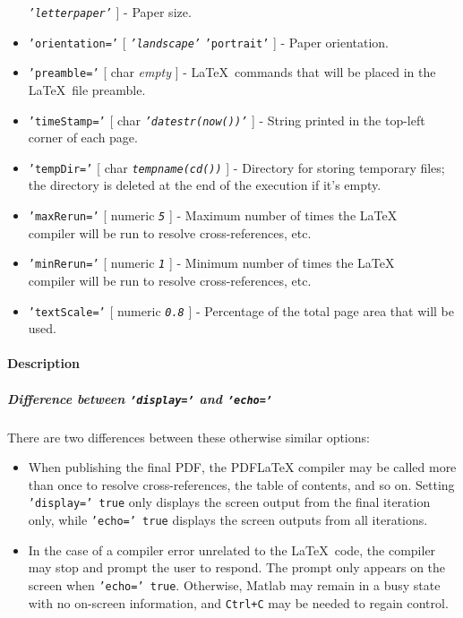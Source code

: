 \begin{itemize}
  \emph{\texttt{'letterpaper'}} {]} - Paper size.
\item
  \texttt{'orientation='} {[} \emph{\texttt{'landscape'}} \textbar{}
  \texttt{'portrait'} {]} - Paper orientation.
\item
  \texttt{'preamble='} {[} char \textbar{} \emph{empty} {]} -
  \LaTeX~commands that will be placed in the \LaTeX~file preamble.
\item
  \texttt{'timeStamp='} {[} char \textbar{}
  \emph{\texttt{'datestr(now())'}} {]} - String printed in the top-left
  corner of each page.
\item
  \texttt{'tempDir='} {[} char \textbar{} \emph{\texttt{tempname(cd())}}
  {]} - Directory for storing temporary files; the directory is deleted
  at the end of the execution if it's empty.
\item
  \texttt{'maxRerun='} {[} numeric \textbar{} \emph{\texttt{5}} {]} -
  Maximum number of times the \LaTeX\\compiler will be run to resolve
  cross-references, etc.
\item
  \texttt{'minRerun='} {[} numeric \textbar{} \emph{\texttt{1}} {]} -
  Minimum number of times the \LaTeX\\compiler will be run to resolve
  cross-references, etc.
\item
  \texttt{'textScale='} {[} numeric \textbar{} \emph{\texttt{0.8}} {]} -
  Percentage of the total page area that will be used.
\end{itemize}

\paragraph{Description}

\subparagraph{Difference between \texttt{'display='} and
\texttt{'echo='}}

There are two differences between these otherwise similar options:

\begin{itemize}
\item
  When publishing the final PDF, the PDFLaTeX compiler may be called
  more than once to resolve cross-references, the table of contents, and
  so on. Setting \texttt{'display=' true} only displays the screen
  output from the final iteration only, while \texttt{'echo=' true}
  displays the screen outputs from all iterations.
\item
  In the case of a compiler error unrelated to the \LaTeX~code, the
  compiler may stop and prompt the user to respond. The prompt only
  appears on the screen when \texttt{'echo=' true}. Otherwise, Matlab
  may remain in a busy state with no on-screen information, and
  \texttt{Ctrl+C} may be needed to regain control.
\end{itemize}

